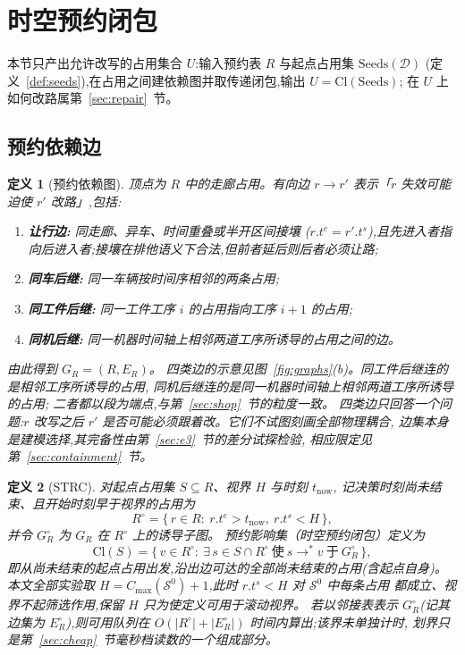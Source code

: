 \documentclass[manuscript,screen,review]{acmart}
\providecommand{\STRC}{\textsc{STRC}}
\newtheorem{definition}{定义}
\begin{document}
\section{时空预约闭包}
\label{sec:strc}

本节只产出允许改写的占用集合 \(U\):输入预约表 \(R\) 与起点占用集 \(\mathrm{Seeds}(\mathcal{D})\)
(定义~\ref{def:seeds}),在占用之间建依赖图并取传递闭包,输出 \(U=\mathrm{Cl}(\mathrm{Seeds})\);
在 \(U\) 上如何改路属第~\ref{sec:repair}~节。

\subsection{预约依赖边}
\label{sec:closure_def}

\begin{definition}[预约依赖图]
\label{def:dep}
顶点为 \(R\) 中的走廊占用。有向边 \(r\to r'\) 表示「\(r\) 失效可能迫使 \(r'\) 改路」,包括:
\begin{enumerate}[leftmargin=1.4em,itemsep=0.15em]
\item \textbf{让行边:} 同走廊、异车、时间重叠\emph{或半开区间接壤}
(\(r.t^e=r'.t^s\)),且先进入者指向后进入者;接壤在排他语义下合法,但前者延后则后者必须让路;
\item \textbf{同车后继:} 同一车辆按时间序相邻的两条占用;
\item \textbf{同工件后继:} 同一工件工序 \(i\) 的占用指向工序 \(i+1\) 的占用;
\item \textbf{同机后继:} 同一机器时间轴上相邻两道工序所诱导的占用之间的边。
\end{enumerate}
由此得到 \(G_R=(R,E_R)\)。
四类边的示意见图~\ref{fig:graphs}(b)。同工件后继连的是相邻工序所诱导的占用,
同机后继连的是同一机器时间轴上相邻两道工序所诱导的占用;
二者都以段为端点,与第~\ref{sec:shop}~节的粒度一致。
四类边只回答一个问题:\(r\) 改写之后 \(r'\) 是否可能必须跟着改。它们不试图刻画全部物理耦合,
边集本身是建模选择,其完备性由第~\ref{sec:e3}~节的差分试探检验,
相应限定见第~\ref{sec:containment}~节。
\end{definition}

\begin{definition}[\STRC{}]
\label{def:strc}
对起点占用集 \(S\subseteq R\)、视界 \(H\) 与时刻 \(t_{\mathrm{now}}\),
记决策时刻尚未结束、且开始时刻早于视界的占用为
\[
R^{\circ}=\bigl\{\,r\in R:\ r.t^e>t_{\mathrm{now}},\ r.t^s<H\,\bigr\},
\]
并令 \(G_R^\circ\) 为 \(G_R\) 在 \(R^{\circ}\) 上的诱导子图。
预约影响集（时空预约闭包）定义为
\[
\mathrm{Cl}(S)
=\bigl\{\,v\in R^{\circ}:\
\exists\,s\in S\cap R^{\circ}\ \text{使}\ s\!\to^*\!v\ \text{于}\ G_R^\circ\,\bigr\},
\]
即从尚未结束的起点占用出发,沿出边可达的全部尚未结束的占用(含起点自身)。
本文全部实验取 \(H=C_{\max}(\mathcal{S}^0)+1\),此时 \(r.t^s<H\) 对 \(\mathcal{S}^0\) 中每条占用
都成立、视界不起筛选作用,保留 \(H\) 只为使定义可用于滚动视界。
若以邻接表表示 \(G_R^\circ\)(记其边集为 \(E_R^{\circ}\)),则可用队列在
\(O(|R^{\circ}|+|E_R^{\circ}|)\) 时间内算出;该界未单独计时,
划界只是第~\ref{sec:cheap}~节毫秒档读数的一个组成部分。
\end{definition}
\end{document}
